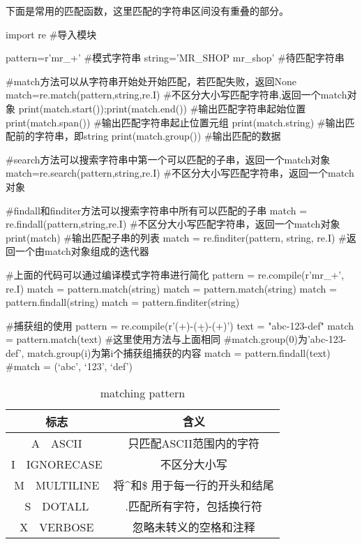     下面是常用的匹配函数，这里匹配的字符串区间没有重叠的部分。
    \begin{codeblock}[language=python, caption={string matching}]
      import re #导入模块

      pattern=r'mr_\w+' #模式字符串
      string='MR_SHOP mr_shop' #待匹配字符串

      #match方法可以从字符串开始处开始匹配，若匹配失败，返回None
      match=re.match(pattern,string,re.I) #不区分大小写匹配字符串,返回一个match对象
      print(match.start());print(match.end()) #输出匹配字符串起始位置
      print(match.span()) #输出匹配字符串起止位置元组
      print(match.string) #输出匹配前的字符串，即string
      print(match.group()) #输出匹配的数据

      #search方法可以搜索字符串中第一个可以匹配的子串，返回一个match对象
      match=re.search(pattern,string,re.I) #不区分大小写匹配字符串，返回一个match对象

      #findall和finditer方法可以搜索字符串中所有可以匹配的子串
      match = re.findall(pattern,string,re.I) #不区分大小写匹配字符串，返回一个match对象
      print(match) #输出匹配子串的列表
      match = re.finditer(pattern, string, re.I) #返回一个由match对象组成的迭代器

      #上面的代码可以通过编译模式字符串进行简化
      pattern = re.compile(r'mr_\w+', re.I)
      match = pattern.match(string)
      match = pattern.match(string)
      match = pattern.findall(string)
      match = pattern.finditer(string)

      #捕获组的使用
      pattern = re.compile(r'(\w+)-(\d+)-(\w+)')
      text = "abc-123-def"
      match = pattern.match(text) #这里使用方法与上面相同
      #match.group(0)为'abc-123-def', match.group(i)为第i个捕获组捕获的内容
      match = pattern.findall(text) #match = \lbrack(`abc', `123', `def')\rbrack
    \end{codeblock}

    \begin{table}[htb]
      \centering
      \caption{matching pattern}
      \label{tab:matching pattern}
      \begin{tabular}{cc}
        \toprule[1.5pt]
        标志 & 含义 \\
        \midrule
        A~~ASCII & 只匹配ASCII范围内的字符 \\
        I~~IGNORECASE & 不区分大小写 \\
        M~~MULTILINE & 将\^{}和\$ 用于每一行的开头和结尾 \\
        S~~DOTALL & .匹配所有字符，包括换行符 \\
        X~~VERBOSE & 忽略未转义的空格和注释 \\
        \bottomrule[1.5pt]
      \end{tabular}
    \end{table}

